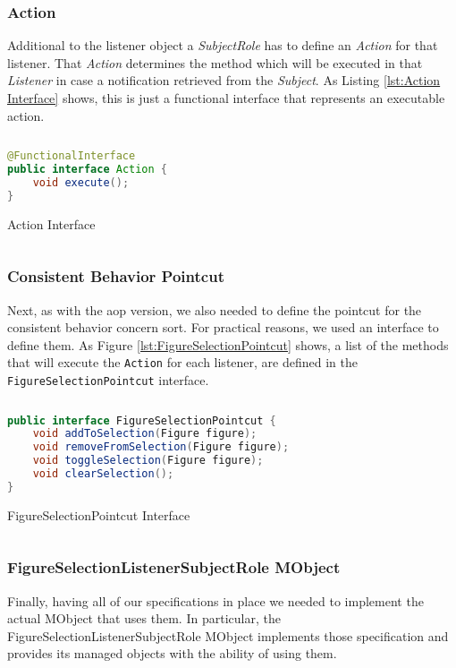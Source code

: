 \subsubsection{Action}
Additional to the listener object a \textit{SubjectRole} has to define an \textit{Action} for that listener.
That \textit{Action} determines the method which will be executed in that \textit{Listener} in case a notification retrieved from the \textit{Subject}.
As Listing \ref{lst:Action Interface} shows, this is just a functional interface that represents an executable action.

\begin{sourcecode} [H]
	\begin{lstlisting}[language=Java, escapechar=|]
@FunctionalInterface
public interface Action {
	void execute();
}
	\end{lstlisting}
	\caption{Action Interface}
	\label{lst:Action Interface}
\end{sourcecode}

\subsubsection{Consistent Behavior Pointcut}
Next, as with the \ac{aop} version, we also needed to define the pointcut for the consistent behavior concern sort.
For practical reasons, we used an interface to define them.
As Figure \ref{lst:FigureSelectionPointcut} shows, a list of the methods that will execute the \texttt{Action} for each listener, are defined in the \texttt{FigureSelectionPointcut} interface. 

\begin{sourcecode} [H]
	\begin{lstlisting}[language=Java, escapechar=|]
public interface FigureSelectionPointcut {
	void addToSelection(Figure figure);
	void removeFromSelection(Figure figure);
	void toggleSelection(Figure figure);
	void clearSelection();
}
	\end{lstlisting}
	\caption{FigureSelectionPointcut Interface}
	\label{lst:FigureSelectionPointcut}
\end{sourcecode}

\subsubsection{FigureSelectionListenerSubjectRole MObject}
Finally, having all of our specifications in place we needed to implement the actual MObject that uses them.
In particular, the FigureSelectionListenerSubjectRole MObject implements those specification and provides its managed objects with the ability of using them.

